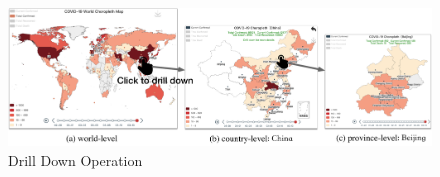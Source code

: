 




\begin{figure}[t!]
	\centering
	\includegraphics[width=.9\columnwidth]{figs/drill_down_new.pdf}
	\vspace{-1.5em}
	\caption{Drill Down Operation}
	\label{fig:drill_down}
\end{figure}



